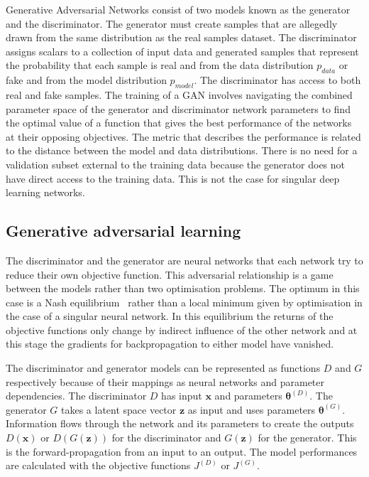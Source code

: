 \documentclass[twocolumn]{article}
\numberwithin{equation}{section}
\begin{document}
Generative Adversarial Networks consist of two models known as the generator and the discriminator. The generator must 
create samples that are allegedly drawn from the same distribution as the real samples dataset. The discriminator assigns 
scalars to a collection of input data and generated samples that represent the probability that each sample is real and 
from the data distribution $p_{data}$ or fake and from the model distribution  $p_{model}$. The discriminator has access 
to both real and fake samples. The training of a GAN involves navigating the combined parameter space of the generator 
and discriminator network parameters to find the optimal value of a function that gives the best performance of the 
networks at their opposing objectives. The metric that describes the performance is related to the distance between 
the model and data distributions. There is no need for a validation subset external to the training data because the 
generator does not have direct access to the training data. This is not the case for singular deep learning networks.


\subsection{Generative adversarial learning}
The discriminator and the generator are neural networks that each network try to reduce their own objective function. 
This adversarial relationship is a game between the models rather than two optimisation problems. The optimum in this 
case is a Nash equilibrium~\cite{NIPS16} rather than a local minimum given by optimisation in the case of a singular 
neural network. In this equilibrium the returns of the objective functions only change by indirect influence of the 
other network and at this stage the gradients for backpropagation to either model have vanished.

The discriminator and generator models can be represented as functions $D$ and $G$ respectively because of their 
mappings as neural networks and parameter dependencies. The discriminator $D$ has input $\mathbf{x}$ and parameters 
$\bm{\theta}^{(D)}$. The generator $G$ takes a latent space vector $\mathbf{z}$ as input and uses parameters 
$\bm{\theta}^{(G)}$. Information flows through the network and its parameters to create the outputs $D(\mathbf{x})$ or 
$D(G(\mathbf{z}))$ for the discriminator and $G(\mathbf{z})$ for the generator. This is the forward-propagation from 
an input to an output. The model performances are calculated with the objective functions $J^{(D)}$ or $J^{(G)}$. 
\end{document}
